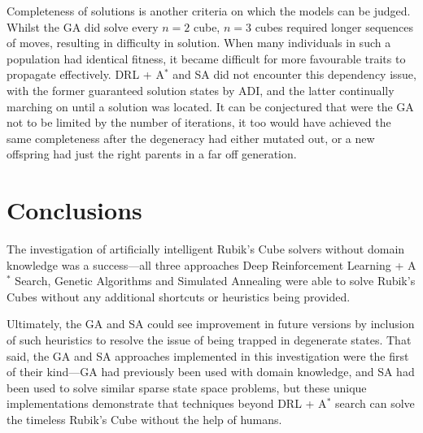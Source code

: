 \documentclass[UKenglish]{libraries/svproc}
\begin{document}
Completeness of solutions is another criteria on which the models can be judged. Whilst the GA did solve every $n=2$ cube, $n=3$ cubes required longer sequences of moves, resulting in difficulty in solution. When many individuals in such a population had identical fitness, it became difficult for more favourable traits to propagate effectively. DRL + A$^{\ast}$ and SA did not encounter this dependency issue, with the former guaranteed solution states by ADI, and the latter continually marching on until a solution was located. It can be conjectured that were the GA not to be limited by the number of iterations, it too would have achieved the same completeness after the degeneracy had either mutated out, or a new offspring had just the right parents in a far off generation.

\section{Conclusions}
The investigation of artificially intelligent Rubik's Cube solvers without domain knowledge was a success---all three approaches Deep Reinforcement Learning + A$^{\ast}$ Search, Genetic Algorithms and Simulated Annealing were able to solve Rubik's Cubes without any additional shortcuts or heuristics being provided.

Ultimately, the GA and SA could see improvement in future versions by inclusion of such heuristics to resolve the issue of being trapped in degenerate states. That said, the GA and SA approaches implemented in this investigation were the first of their kind---GA had previously been used with domain knowledge, and SA had been used to solve similar sparse state space problems, but these unique implementations demonstrate that techniques beyond DRL + A$^{\ast}$ search can solve the timeless Rubik's Cube without the help of humans.

\clearpage
\printbibliography
\end{document}
